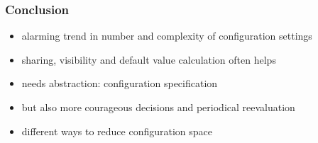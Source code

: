 \begin{frame}
	\frametitle{Conclusion}
	\begin{itemize}
	\item alarming trend in number and complexity of configuration settings
	\item sharing, visibility and default value calculation often helps
	\item needs abstraction: configuration specification
	\item but also more courageous decisions and periodical reevaluation
	\item different ways to reduce configuration space
	\end{itemize}
\end{frame}


\nocite{raab2017introducing}

\appendix

\begin{frame}[allowframebreaks]
	
	
\end{frame}




